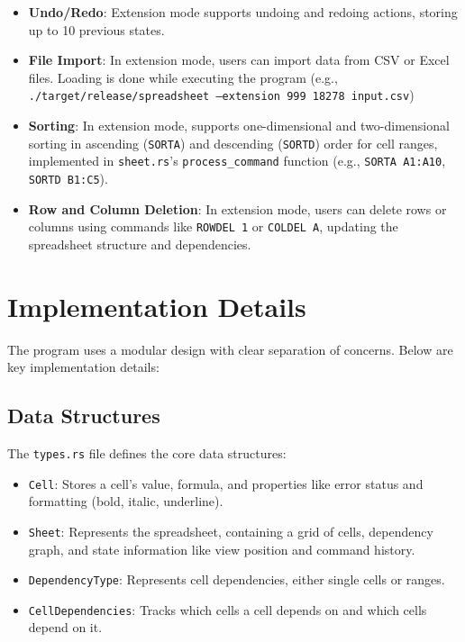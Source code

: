 \documentclass[12pt]{article}
\begin{document}
\begin{itemize}
    \item \textbf{Undo/Redo}: Extension mode supports undoing and redoing actions, storing up to 10 previous states.
    \item \textbf{File Import}: In extension mode, users can import data from CSV or Excel files. Loading is done while executing the program (e.g., \texttt{./target/release/spreadsheet --extension 999 18278 input.csv})
    \item \textbf{Sorting}: In extension mode, supports one-dimensional and two-dimensional sorting in ascending (\texttt{SORTA}) and descending (\texttt{SORTD}) order for cell ranges, implemented in \texttt{sheet.rs}’s \texttt{process\_command} function (e.g., \texttt{SORTA A1:A10}, \texttt{SORTD B1:C5}).
    \item \textbf{Row and Column Deletion}: In extension mode, users can delete rows or columns using commands like \texttt{ROWDEL 1} or \texttt{COLDEL A}, updating the spreadsheet structure and dependencies.
\end{itemize}
   


\section{Implementation Details}
The program uses a modular design with clear separation of concerns. Below are key implementation details:

\subsection{Data Structures}
The \texttt{types.rs} file defines the core data structures:
\begin{itemize}
    \item \texttt{Cell}: Stores a cell’s value, formula, and properties like error status and formatting (bold, italic, underline).
    \item \texttt{Sheet}: Represents the spreadsheet, containing a grid of cells, dependency graph, and state information like view position and command history.
    \item \texttt{DependencyType}: Represents cell dependencies, either single cells or ranges.
    \item \texttt{CellDependencies}: Tracks which cells a cell depends on and which cells depend on it.
\end{itemize}
\end{document}
